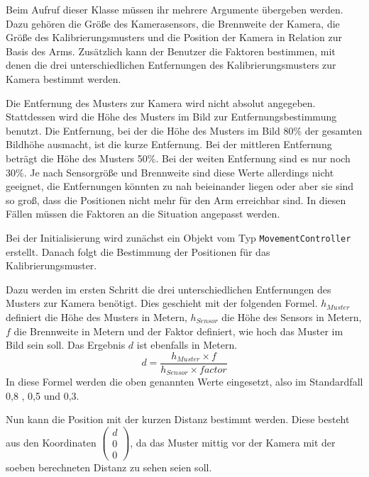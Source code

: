 Beim Aufruf dieser Klasse müssen ihr mehrere Argumente übergeben werden. Dazu gehören die Größe des Kamerasensors, die Brennweite der Kamera, die Größe des Kalibrierungsmusters und die Position der Kamera in Relation zur Basis des Arms. Zusätzlich kann der Benutzer die Faktoren bestimmen, mit denen die drei unterschiedlichen Entfernungen des Kalibrierungsmusters zur Kamera bestimmt werden. 

Die Entfernung des Musters zur Kamera wird nicht absolut angegeben. Stattdessen wird die Höhe des Musters im Bild zur Entfernungsbestimmung benutzt. Die Entfernung, bei der die Höhe des Musters im Bild 80\% der gesamten Bildhöhe ausmacht, ist die kurze Entfernung. Bei der mittleren Entfernung beträgt die Höhe des Musters 50\%. Bei der weiten Entfernung sind es nur noch 30\%. Je nach Sensorgröße und Brennweite sind diese Werte allerdings nicht geeignet, die Entfernungen könnten zu nah beieinander liegen oder aber sie sind so groß, dass die Positionen nicht mehr für den Arm erreichbar sind. In diesen Fällen müssen die Faktoren an die Situation angepasst werden.

Bei der Initialisierung wird zunächst ein Objekt vom Typ \texttt{MovementController} erstellt. Danach folgt die Bestimmung der Positionen für das Kalibrierungsmuster.

Dazu werden im ersten Schritt die drei unterschiedlichen Entfernungen des Musters zur Kamera benötigt. Dies geschieht mit der folgenden Formel. $h_{Muster}$ definiert die Höhe des Musters in Metern, $h_{Sensor}$ die Höhe des Sensors in Metern, $f$ die Brennweite in Metern und der Faktor definiert, wie hoch das Muster im Bild sein soll. Das Ergebnis $d$ ist ebenfalls in Metern.
\begin{equation}
	d = \frac{h_{Muster} \times f }{h_{Sensor} \times factor}
\end{equation}
In diese Formel werden die oben genannten Werte eingesetzt, also im Standardfall 0,8 , 0,5 und 0,3.

Nun kann die Position mit der kurzen Distanz bestimmt werden. Diese besteht aus den Koordinaten $\begin{pmatrix}
	d\\ 0\\ 0
\end{pmatrix}$, da das Muster mittig vor der Kamera mit der soeben berechneten Distanz zu sehen seien soll.

